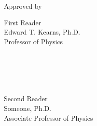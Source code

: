 
\thispagestyle{empty}

\begin{singlespace}
\vspace{3.5in}

\begin{center}
{Approved by}
\end{center}

\vspace{2.0in}

\begin{tabbing}

First Reader\hspace{0.5in}\= \underline{\hspace{4.5in}}\\
\> Edward T. Kearns, Ph.D.\\
\> Professor of Physics\\ 

\\
\\
\\
\\
\\

Second Reader\>\underline{\hspace{4.5in}}\\
\> Someone, Ph.D.\\
\> Associate Professor of Physics\\ 

\end{tabbing}
\end{singlespace}
